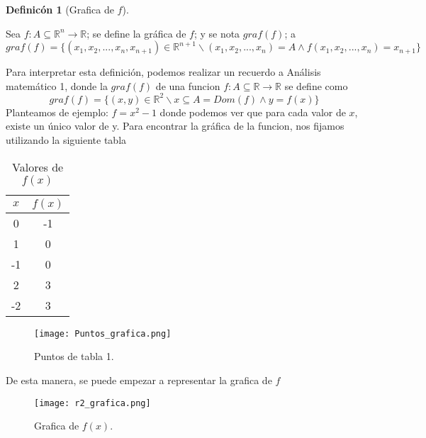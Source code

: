\documentclass[10pt, a4paper]{report}
\renewcommand{\Re}{\mathbb {R}}
\theoremstyle{definition} %
\newtheorem{definition}{Definic\'on}[section]
\begin{document}
\begin{definition} [Grafica de $f$] 
\label{def:grafica}
 \mbox{}
 
Sea $f: A\subseteq\Re^n\rightarrow\Re$; se define la gráfica de $f$; y se nota $graf(f)$; a
 \[
graf(f)=\{(x_1,x_2,...,x_n,x_{n+1})\in\Re^{n+1} \backslash (x_1,x_2,...,x_n)=A \land f(x_1,x_2,...,x_n)=x_{n+1} \}
 \]

Para interpretar esta definición, podemos realizar un recuerdo a Análisis matemático 1, donde la $graf (f)$ de una funcion $f: A\subseteq\Re\rightarrow\Re$ se define como
 \[
graf(f)=\{(x,y)\in\Re^2 \backslash x\subseteq A=Dom(f) \land y=f(x) \}
 \]
Planteamos de ejemplo: $f=x^2-1$ donde podemos ver que para cada valor de $x$, existe un único valor de y. Para encontrar la gráfica de la funcion, nos fijamos utilizando la siguiente tabla
\begin{table}[h!]
\centering
\begin{tabular}{|c|c|}
\hline
\textbf{$x$} & \textbf{$f(x)$}  \\ \hline
0             & -1                         \\ \hline
1             & 0                        \\ \hline
-1             & 0                          \\ \hline
2             & 3                          \\ \hline
-2             & 3                          \\ \hline
\end{tabular}
\caption{Valores de $f(x)$}
\label{tabla1}
\end{table}
\begin{figure}[h!] %
    \centering
    \texttt{[image: Puntos\_grafica.png]} %
    \caption{Puntos de tabla 1.}
    \label{fig:ejemplo} %
\end{figure}


De esta manera, se puede empezar a representar la grafica de $f$
\begin{figure}[h!] %
    \centering
    \texttt{[image: r2\_grafica.png]} %
    \caption{Grafica de $f(x)$.}
    \label{fig:ejemplo} %
\end{figure}
\end{definition}
\end{document}
